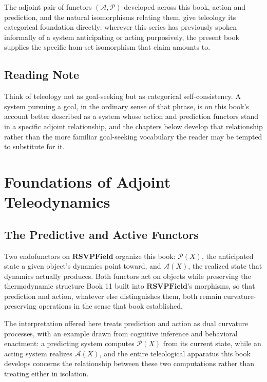 The adjoint pair of functors $(\mathcal{A}, \mathcal{P})$ developed across this book, action and prediction, and the natural isomorphisms relating them, give teleology its categorical foundation directly: wherever this series has previously spoken informally of a system anticipating or acting purposively, the present book supplies the specific hom-set isomorphism that claim amounts to.

\chapter*{Reading Note}

Think of teleology not as goal-seeking but as categorical self-consistency. A system pursuing a goal, in the ordinary sense of that phrase, is on this book's account better described as a system whose action and prediction functors stand in a specific adjoint relationship, and the chapters below develop that relationship rather than the more familiar goal-seeking vocabulary the reader may be tempted to substitute for it.

\part{Foundations of Adjoint Teleodynamics}

\chapter{The Predictive and Active Functors}

Two endofunctors on $\mathbf{RSVPField}$ organize this book: $\mathcal{P}(X)$, the anticipated state a given object's dynamics point toward, and $\mathcal{A}(X)$, the realized state that dynamics actually produces. Both functors act on objects while preserving the thermodynamic structure Book 11 built into $\mathbf{RSVPField}$'s morphisms, so that prediction and action, whatever else distinguishes them, both remain curvature-preserving operations in the sense that book established.

The interpretation offered here treats prediction and action as dual curvature processes, with an example drawn from cognitive inference and behavioral enactment: a predicting system computes $\mathcal{P}(X)$ from its current state, while an acting system realizes $\mathcal{A}(X)$, and the entire teleological apparatus this book develops concerns the relationship between these two computations rather than treating either in isolation.

